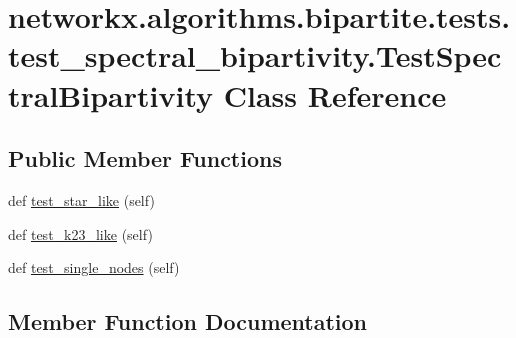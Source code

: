 \hypertarget{classnetworkx_1_1algorithms_1_1bipartite_1_1tests_1_1test__spectral__bipartivity_1_1TestSpectralBipartivity}{}\section{networkx.\+algorithms.\+bipartite.\+tests.\+test\+\_\+spectral\+\_\+bipartivity.\+Test\+Spectral\+Bipartivity Class Reference}
\label{classnetworkx_1_1algorithms_1_1bipartite_1_1tests_1_1test__spectral__bipartivity_1_1TestSpectralBipartivity}
\subsection*{Public Member Functions}
\begin{DoxyCompactItemize}
\item 
def \hyperlink{classnetworkx_1_1algorithms_1_1bipartite_1_1tests_1_1test__spectral__bipartivity_1_1TestSpectralBipartivity_a22323ff42996d72cb8964ba8deb0b697}{test\+\_\+star\+\_\+like} (self)
\item 
def \hyperlink{classnetworkx_1_1algorithms_1_1bipartite_1_1tests_1_1test__spectral__bipartivity_1_1TestSpectralBipartivity_a8c10155bf5a8f939e358a1f6878473e1}{test\+\_\+k23\+\_\+like} (self)
\item 
def \hyperlink{classnetworkx_1_1algorithms_1_1bipartite_1_1tests_1_1test__spectral__bipartivity_1_1TestSpectralBipartivity_a3bb6610a6195a8d0e343e38befcfbdba}{test\+\_\+single\+\_\+nodes} (self)
\end{DoxyCompactItemize}


\subsection{Member Function Documentation}
\mbox{\label{classnetworkx_1_1algorithms_1_1bipartite_1_1tests_1_1test__spectral__bipartivity_1_1TestSpectralBipartivity_a8c10155bf5a8f939e358a1f6878473e1}} 
